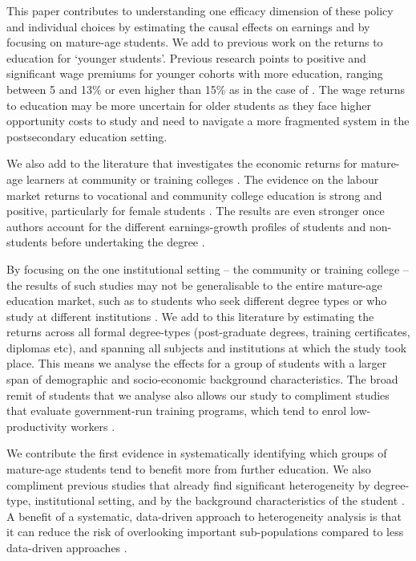 \documentclass[12pt, a4paper]{article}
\begin{document}
This paper contributes to understanding one efficacy dimension of these policy
and individual choices by estimating the causal effects on earnings and by
focusing on mature-age students. We add to previous work on the returns to
education for `younger students'. Previous research points to positive and
significant wage premiums for younger cohorts with more education, ranging
between 5 and 13\% \citep{angrist1991,harmon2003,machin2006} or even higher
than 15\% as in the case of \cite{harmon1995}. The wage returns to education
may be more uncertain for older students as they face higher opportunity costs
to study and need to navigate a more fragmented system in the postsecondary
education setting.

We also add to the literature that investigates the economic returns for
mature-age learners at community or training colleges \citep{jacobson2005, chesters2015, 
zeiden2015, polidano2016, xu2016, belfield2017, dynarski2016, dynarski2018,
mountjoy2022}. The evidence on the labour market returns to vocational and
community college education is strong and positive, particularly for female
students \citep{belfield2017, zeiden2015, perales2017}. The results are even
stronger once authors account for the different earnings-growth profiles of
students and non-students before undertaking the degree \citep{dynarski2016,
dynarski2018}.

By focusing on the one institutional setting -- the community or training
college -- the results of such studies may not be generalisable to the entire
mature-age education market, such as to students who seek different degree
types or who study at different institutions \citep{belfield2017model,
mountjoy2022}. We add to this literature by estimating the returns across all
formal degree-types (post-graduate degrees, training certificates, diplomas
etc), and spanning all subjects and institutions at which the study took place.
This means we analyse the effects for a group of students with a larger span of
demographic and socio-economic background characteristics. The broad remit of
students that we analyse also allows our study to compliment studies that
evaluate government-run training programs, which tend to enrol low-productivity
workers \citep{ashenfelter1978, ashenfelter1985, bloom1990, leigh1990,
raaum2002, jacobson2005, card2018, knaus2022}. 

We contribute the first evidence in systematically identifying which groups of
mature-age students tend to benefit more from further education. We also
compliment previous studies that already find significant heterogeneity by
degree-type, institutional setting, and by the background characteristics of
the student \citep{blanden2012, zeiden2015, polidano2016, dorsett2016, xu2016,
belfield2017,perales2017, bockerman2019}. A benefit of a systematic,
data-driven approach to heterogeneity analysis is that it can reduce the risk
of overlooking important sub-populations compared to less data-driven
approaches \citep{athey2017, knaus2021}. 
\end{document}
